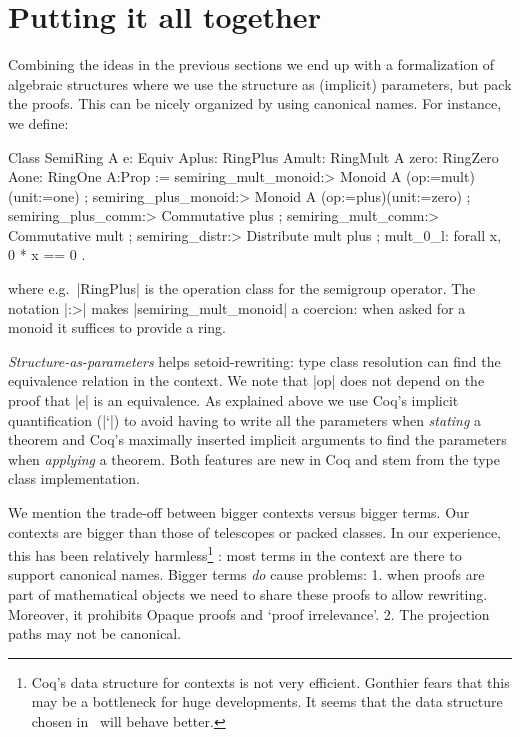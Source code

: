 \documentclass[a4paper,10pt,runningheads]{llncs}
\begin{document}
\section{Putting it all together}\label{classes}
Combining the ideas in the previous sections we end up with a formalization of algebraic
structures where we use the structure as (implicit) parameters, but
pack the proofs. This can be nicely organized by using canonical names. For instance, we define:
\begin{code}
Class SemiRing A {e: Equiv A}{plus: RingPlus A}{mult: RingMult A}
                 {zero: RingZero A}{one: RingOne A}:Prop :=
  { semiring_mult_monoid:> Monoid A (op:=mult)(unit:=one)
  ; semiring_plus_monoid:> Monoid A (op:=plus)(unit:=zero)
  ; semiring_plus_comm:> Commutative plus
  ; semiring_mult_comm:> Commutative mult
  ; semiring_distr:> Distribute mult plus
  ; mult_0_l: forall x, 0 * x == 0 }.
\end{code}
where e.g.\ |RingPlus| is the operation class for the semigroup operator.
The notation |:>| makes |semiring_mult_monoid| a coercion: when asked for a monoid it suffices to
provide a ring.

\emph{Structure-as-parameters} helps setoid-rewriting: type class resolution
can find the equivalence relation in the context.
We note that |op| does not depend on the proof that |e| is an equivalence. As explained above we
use Coq's implicit quantification (|`{}|) to avoid having to write all the parameters when
\emph{stating} a theorem and Coq's maximally inserted implicit arguments to find the parameters when
\emph{applying} a theorem. Both features are new in Coq and stem from the type class implementation.

We mention the trade-off between bigger contexts versus bigger terms. Our contexts are bigger than
those of telescopes or packed classes. In our experience, this has been relatively
harmless\footnote{Coq's data structure for contexts is not very efficient. Gonthier fears that this
may be a bottleneck for huge developments. It seems that the data structure chosen
in~\cite{asperti2009compact} will behave better.}%
: most terms in the context are there to support canonical names. Bigger terms
\emph{do} cause problems: 1. when proofs are part of mathematical objects we need to share these
proofs to allow rewriting. Moreover, it prohibits Opaque proofs and `proof irrelevance'. 2. The
projection paths may not be canonical.
\end{document}
